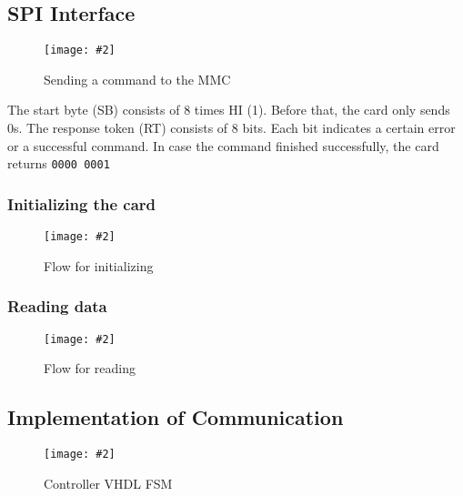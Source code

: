 \documentclass[12pt, a4paper]{article}
\newcommand{\image}[4]{
	\begin{figure}[#4]               %
		\centering                     %
		\texttt{[image: \#2]} %
		\caption{#3}                   %
		\label{fig:#2}                 %
	\end{figure}                     %
}
\begin{document}
\subsection{SPI Interface}

\image{0.8\textwidth}{../spi_mmc_command.pdf}{Sending a command to the MMC}{ht}

The start byte (SB) consists of 8 times HI (1). Before that, the card only sends 0s. The response token (RT) consists of 8 bits. Each bit indicates a certain error or a successful command. In case the command finished successfully, the card returns \texttt{0000 0001}

\subsubsection{Initializing the card}

\image{0.5\textwidth}{../flow_init_mmc.pdf}{Flow for initializing}{ht}

\subsubsection{Reading data}

\image{0.5\textwidth}{../flow_read_mmc.pdf}{Flow for reading}{ht}

\subsection{Implementation of Communication}
\image{1.0\textwidth}{../mmc_controller.pdf}{Controller VHDL FSM}{ht}

\listoffigures
\end{document}
